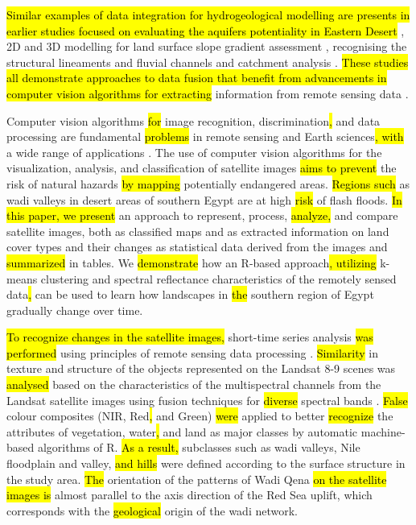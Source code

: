 \documentclass[information,article,submit,pdftex,moreauthors]{Definitions/mdpi}
\begin{document}
\hl{Similar examples of data integration for hydrogeological modelling are presents in earlier studies focused on evaluating the aquifers potentiality in Eastern Desert} \cite{Moneim,ELHAMEED2017218}, 2D and 3D modelling for land surface slope gradient assessment \cite{Othman}, recognising the structural lineaments and fluvial channels and catchment analysis \cite{rs12101559}. \hl{These studies all demonstrate approaches to data fusion that benefit from advancements in computer vision algorithms for extracting} information from remote sensing data \cite{AZZAZY2022104805}.

Computer vision algorithms \hl{for }image recognition, discrimination\hl{, }and data processing are fundamental \hl{problems }in remote sensing and Earth sciences\hl{, with }a wide range of applications 
\cite{ABDELKAREEM2015245,Lemenkova202231,ELQADI2020104696,Husseinetal1995,DHANYA2022211}. The use of computer vision algorithms for the visualization, analysis, and classification of satellite images \hl{aims to prevent }the risk of natural hazards \hl{by mapping }potentially endangered areas. \hl{Regions such }as wadi valleys in desert areas of southern Egypt are at high \hl{risk }of flash floods. \hl{In this paper, we present }an approach to represent, process, \hl{analyze, }and compare satellite images, both as classified maps and as extracted information on land cover types and their changes as statistical data derived from the images and \hl{summarized} in tables. We \hl{demonstrate }how an R-based approach\hl{, utilizing } k-means clustering and spectral reflectance characteristics of the remotely sensed data\hl{, } can be used to learn how landscapes in \hl{the } southern region of Egypt gradually change over time.

\hl{To recognize changes in the satellite images, }short-time series analysis \hl{was performed } using principles of remote sensing data processing \cite{curran1985principles}. \hl{Similarity }in texture and structure of the objects represented on the Landsat 8-9 scenes was \hl{analysed }based on the characteristics of the multispectral channels from the Landsat satellite images using fusion techniques for \hl{diverse }spectral bands \cite{4234117}. \hl{False }colour composites (NIR, Red\hl{, }and Green) \hl{were }applied to better \hl{recognize } the attributes of vegetation, water\hl{, }and land as major classes by automatic machine-based algorithms of R. \hl{As a result, } subclasses such as wadi valleys, Nile floodplain and valley, \hl{and hills }were defined according to the surface structure in the study area. \hl{The } orientation of the patterns of Wadi Qena \hl{on the satellite images is }almost parallel to the axis direction of the Red Sea uplift, which corresponds with the \hl{geological} origin of the wadi network.
\end{document}
